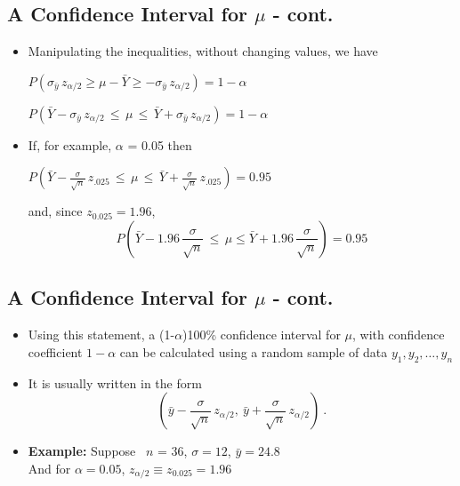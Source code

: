 \documentclass[
  letterpaper,
  DIV=11,
  numbers=noendperiod]{scrartcl}
\begin{document}
\subsection{\texorpdfstring{A Confidence Interval for \(\mu\) -
cont.}{A Confidence Interval for \textbackslash mu - cont.}}\label{a-confidence-interval-for-mu---cont.-1}

\begin{itemize}
\item
  Manipulating the inequalities, without changing values, we have

  \(P(\sigma_{\bar{y}} \, z_{\alpha/2} \geq \mu - \bar{Y}
    \geq - \sigma_{\bar{y}} \, z_{\alpha/2}) = 1 - \alpha\)

  \(P(\bar{Y} - \sigma_{\bar{y}} \, z_{\alpha/2}\, \leq\,
    \mu\, \leq\, \bar{Y} + \sigma_{\bar{y}} \, z_{\alpha/2}) = 1 - \alpha\)
\item
  If, for example, \(\alpha\) = 0.05 then

  \(P(\bar{Y} - \frac{\sigma}{\sqrt{n}} \, z_{.025}\, \leq
  \,  \mu\, \leq\, \bar{Y} + \frac{\sigma}{\sqrt{n}} \, z_{.025}) =0.95\)

  and, since \(z_{0.025} = 1.96\),\\
  \[P(\bar{Y} - 1.96\, \frac{\sigma}{\sqrt{n}}\, \leq\, \mu \leq \bar{Y} +
    1.96\, \frac{\sigma}{\sqrt{n}}) = 0.95\]
\end{itemize}

\subsection{\texorpdfstring{A Confidence Interval for \(\mu\) -
cont.}{A Confidence Interval for \textbackslash mu - cont.}}\label{a-confidence-interval-for-mu---cont.-2}

\begin{itemize}
\item
  Using this statement, a {(1-\(\alpha\))100\% confidence interval for
  \(\mu\), with confidence coefficient \(1-\alpha\)} can be calculated
  using a random sample of data \(y_1,y_2,\ldots,y_n\)
\item
  It is usually written in the form
  \[\left( \bar{y} - \frac{\sigma}{\sqrt{n}} \, z_{\alpha/2}, \
           \bar{y} + \frac{\sigma}{\sqrt{n}} \, z_{\alpha/2}\right) \ .\]
\item
  \textbf{Example:} Suppose ~\(n\) = 36, \(\sigma=12\),
  \(\bar{y} = 24.8\)\\
  And for \(\alpha=0.05\), \(z_{\alpha/2} \equiv z_{0.025} = 1.96\)
\end{itemize}
\end{document}
